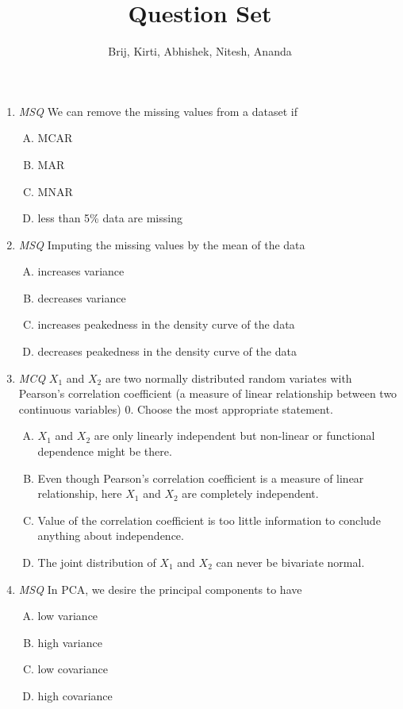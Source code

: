 \documentclass[11pt, a4paper]{article}
\title{Question Set}
\author{Brij, Kirti, Abhishek, Nitesh, Ananda}
\date{}
\begin{document}
\maketitle

\begin{enumerate}[1.]

\item \textit{MSQ} We can remove the missing values from a dataset if

	\begin{enumerate}[(A)]
		\item MCAR
		\item MAR
		\item MNAR
		\item less than 5\% data are missing
	\end{enumerate}

\item \textit{MSQ} Imputing the missing values by the mean of the data
	\begin{enumerate}[(A)]
		\item increases variance
		\item decreases variance
		\item increases peakedness in the density curve of the data
		\item decreases peakedness in the density curve of the data
	\end{enumerate}
	

\item \textit{MCQ} $X_1$ and $X_2$ are two normally distributed random variates with Pearson's correlation coefficient (a measure of linear relationship between two continuous variables) 0. Choose the most appropriate statement.
	\begin{enumerate}[(A)]
		\item $X_1$ and $X_2$ are only linearly independent but non-linear or functional dependence might be there.
		\item Even though Pearson's correlation coefficient is a measure of linear relationship, here $X_1$ and $X_2$ are completely independent.
		\item Value of the correlation coefficient is too little information to conclude anything about independence.
		\item The joint distribution of $X_1$ and $X_2$ can never be bivariate normal.	
	\end{enumerate}
	

\item \textit{MSQ} In PCA, we desire the principal components to have
	\begin{enumerate}[(A)]
		\item low variance
		\item high variance
		\item low covariance
		\item high covariance	
	\end{enumerate}
	


\end{enumerate}
\end{document}
